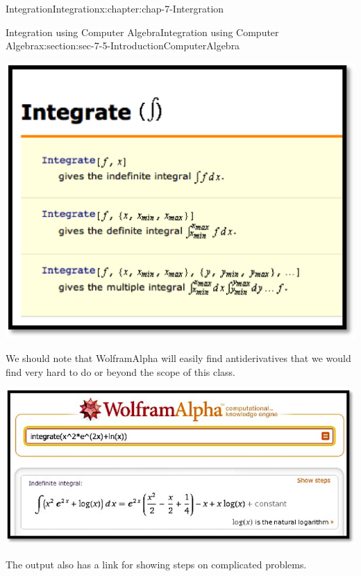 \documentclass[oneside,10pt,]{book}
\numberwithin{equation}{section}
\begin{document}
\begin{chapterptx}{Integration}{}{Integration}{}{}{x:chapter:chap-7-Intergration}
\begin{sectionptx}{Integration using Computer Algebra}{}{Integration using Computer Algebra}{}{}{x:section:sec-7-5-IntroductionComputerAlgebra}
\begin{sidebyside}{1}{0}{0}{0}%
\begin{sbspanel}{1}%
\includegraphics[width=\linewidth]{images/sec7-5-6.png}
\end{sbspanel}%
\end{sidebyside}%
\par
We should note that Wolfram\textbar{}Alpha will easily find antiderivatives that we would find very hard to do or beyond the scope of this class.%
\begin{sidebyside}{1}{0.1}{0.1}{0}%
\begin{sbspanel}{0.8}%
\includegraphics[width=\linewidth]{images/sec7-5-7.png}
\end{sbspanel}%
\end{sidebyside}%
\par
The output also has a link for showing steps on complicated problems.%
\begin{sidebyside}{1}{0.1}{0.1}{0}%
\begin{sbspanel}{0.8}%

\end{sbspanel}
\end{sidebyside}
\end{sectionptx}
\end{chapterptx}
\end{document}
